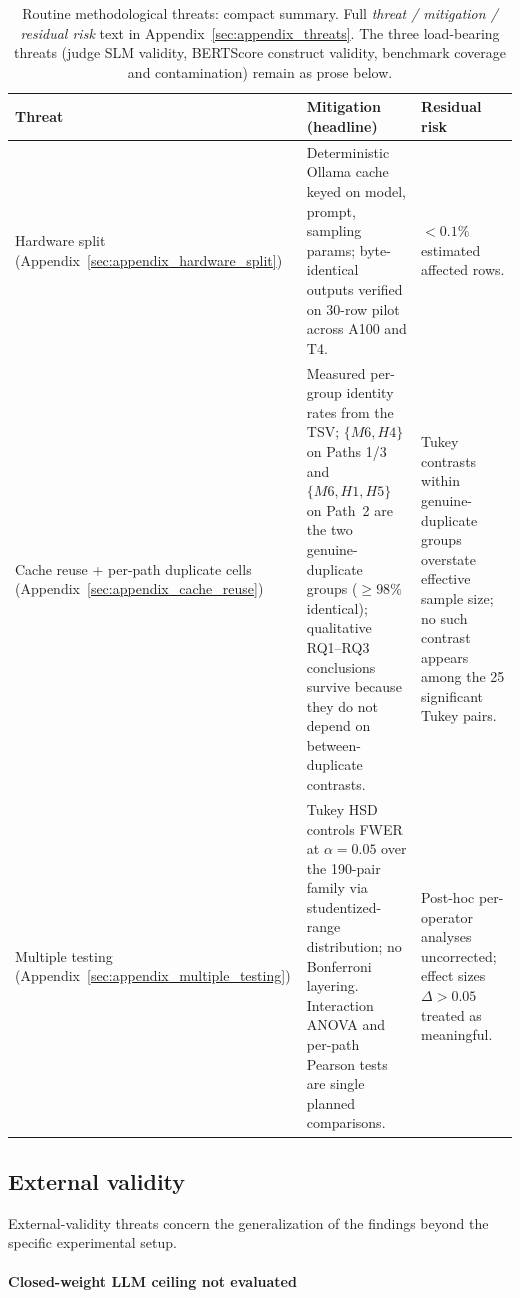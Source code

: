 \begin{table}[!htbp]
\centering
\small
\caption{Routine methodological threats: compact summary. Full
\emph{threat / mitigation / residual risk} text in
Appendix~\ref{sec:appendix_threats}. The three load-bearing threats
(judge SLM validity, BERTScore construct validity, benchmark coverage
and contamination) remain as prose below.}
\label{tab:threats_routine}
\begin{tabular}{@{}p{3cm}p{5cm}p{4.5cm}@{}}
\toprule
Threat & Mitigation (headline) & Residual risk \\
\midrule
Hardware split
(Appendix~\ref{sec:appendix_hardware_split})
&
Deterministic Ollama cache keyed on model, prompt, sampling params;
byte-identical outputs verified on 30-row pilot across A100 and T4.
&
$<0.1\%$ estimated affected rows. \\
\addlinespace
Cache reuse + per-path duplicate cells
(Appendix~\ref{sec:appendix_cache_reuse})
&
Measured per-group identity rates from the TSV;
$\{M6, H4\}$ on Paths 1/3 and $\{M6, H1, H5\}$ on Path~2 are the two
genuine-duplicate groups ($\geq 98\%$ identical); qualitative
RQ1--RQ3 conclusions survive because they do not depend on
between-duplicate contrasts.
&
Tukey contrasts within genuine-duplicate groups overstate effective
sample size; no such contrast appears among the 25 significant
Tukey pairs. \\
\addlinespace
Multiple testing
(Appendix~\ref{sec:appendix_multiple_testing})
&
Tukey HSD controls FWER at $\alpha = 0.05$ over the 190-pair family
via studentized-range distribution; no Bonferroni layering.
Interaction ANOVA and per-path Pearson tests are single planned
comparisons.
&
Post-hoc per-operator analyses uncorrected; effect sizes
$\Delta > 0.05$ treated as meaningful. \\
\bottomrule
\end{tabular}
\end{table}

\subsection{External validity}
\label{sec:limitations_external}

External-validity threats concern the generalization of the findings beyond the specific experimental setup.

\paragraph{Closed-weight LLM ceiling not evaluated}

